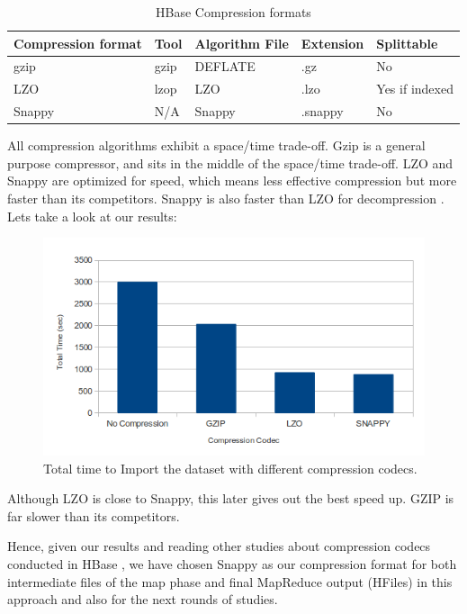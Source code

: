 \begin{table}[htbp]

\begin{tabular}{|l|l|l|l|l|}
\hline
Compression format  & Tool  & Algorithm File  & Extension  & Splittable \\ \hline
gzip &  gzip  & DEFLATE  & .gz &  No \\ \hline
LZO &  lzop &  LZO  & .lzo &  Yes if indexed \\ \hline
Snappy  & N/A  & Snappy  & .snappy  & No \\ \hline
\end{tabular}
\label{}
\caption{HBase Compression formats}
\end{table}


All compression algorithms exhibit a space/time trade-off. Gzip is a general purpose compressor, and sits in the middle of the space/time trade-off. LZO and Snappy are optimized for speed, which means less effective compression but more faster than its competitors. Snappy is also faster than LZO for decompression \cite{CompressionHadoop}. Lets take a look at our results:


\begin{figure}[htb]
\centering
\includegraphics[width=1\textwidth]{./images/codecs.png}
\caption{Total time to Import the dataset with different compression codecs.} \label{fig:codecs}
\end{figure}


Although LZO is close to Snappy, this later gives out the best speed up. GZIP is far slower than its competitors.

Hence, given our results and reading other studies about compression codecs conducted in HBase \cite{CompressionComparison}, we have chosen Snappy as our compression format for both intermediate files of the map phase and final MapReduce output (HFiles) in this approach and also for the next rounds of studies.




